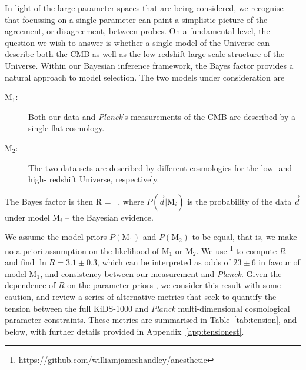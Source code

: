 In light of the large parameter spaces that are being considered, we recognise that focussing on a single parameter can paint a simplistic picture of the agreement, or disagreement, between probes.
On a fundamental level, the question we wish to answer is whether a single model of the Universe can describe both the CMB as well as the low-redshift large-scale structure of the Universe.
Within our Bayesian inference framework, the Bayes factor provides a natural approach to model selection. 
The two models under consideration are 
\begin{description}
	\item[$\mathrm{M}_1$:] Both our \tttp data and {\it Planck}'s measurements of the CMB are described by a single flat \LCDM cosmology.
	\item[$\mathrm{M}_2$:] The two data sets are described by different cosmologies for the low- and high- redshift Universe, respectively.
\end{description}
The Bayes factor is then
\be
\label{equ:bayes-factor}
	R =  \ ,
\ee
where $P(\vec d | \mathrm{M}_i)$ is the probability of the data $\vec d$ under model $\mathrm{M}_i$ -- the Bayesian evidence. 

We assume the model priors $P(\mathrm{M}_1)$ and $P(\mathrm{M}_2)$ to be equal, that is, we make no a-priori assumption on the likelihood of $\mathrm{M}_1$ or $\mathrm{M}_2$. 
We use \footnote{\url{https://github.com/williamjameshandley/anesthetic}}\citep{anesthetic} to compute $R$ and find $\ln R=3.1\pm0.3$, which can be interpreted as odds of $23\pm6$ in favour of model $\mathrm{M}_1$, and consistency between our \tttp measurement and {\it Planck}.  Given the dependence of $R$ on the parameter priors \citep{handley/lemos:2019}, we consider this result with some caution, and review a series of alternative metrics that seek to quantify the tension between the full KiDS-1000 and {\it Planck} multi-dimensional cosmological parameter constraints.   These metrics are summarised in Table~\ref{tab:tension}, and below, with further details provided in Appendix~\ref{app:tensionest}.

